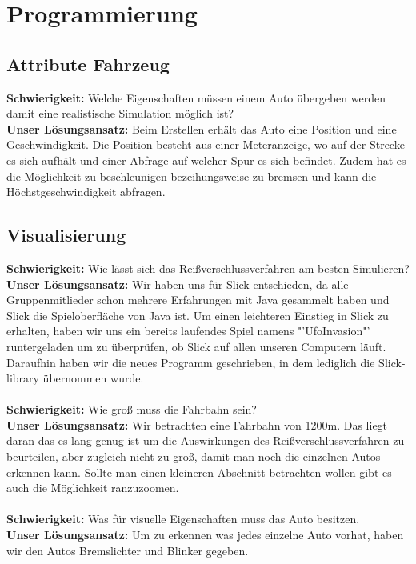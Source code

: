 \chapter{Programmierung}
\section{Attribute Fahrzeug}
\textbf{Schwierigkeit:} Welche Eigenschaften müssen einem Auto übergeben werden damit eine realistische Simulation möglich ist?\\
\textbf{Unser Lösungsansatz:} Beim Erstellen erhält das Auto eine Position und eine Geschwindigkeit. Die Position besteht aus einer Meteranzeige, wo auf der Strecke es sich aufhält und einer Abfrage auf welcher Spur es sich befindet. Zudem hat es die Möglichkeit zu beschleunigen bezeihungsweise zu bremsen und kann die Höchstgeschwindigkeit abfragen. \\
\section{Visualisierung}
\textbf{Schwierigkeit:} Wie lässt sich das Reißverschlussverfahren am besten Simulieren?\\
\textbf{Unser Lösungsansatz:} Wir haben uns für Slick entschieden, da alle Gruppenmitlieder schon mehrere Erfahrungen mit Java gesammelt haben und Slick die Spieloberfläche von Java ist. Um einen leichteren Einstieg in Slick zu erhalten, haben wir uns ein bereits laufendes Spiel namens "'UfoInvasion"' runtergeladen um zu überprüfen, ob Slick auf allen unseren Computern läuft. Daraufhin haben wir die neues Programm geschrieben, in dem lediglich die Slick-library übernommen wurde. \\\\
\textbf{Schwierigkeit:} Wie groß muss die Fahrbahn sein?\\
\textbf{Unser Lösungsansatz:} Wir betrachten eine Fahrbahn von 1200m. Das liegt daran das es lang genug ist um die Auswirkungen des Reißverschlussverfahren zu beurteilen, aber zugleich nicht zu groß, damit man noch die einzelnen Autos erkennen kann. Sollte man einen kleineren Abschnitt betrachten wollen gibt es auch die Möglichkeit ranzuzoomen.\\\\
\textbf{Schwierigkeit:} Was für visuelle Eigenschaften muss das Auto besitzen.\\
\textbf{Unser Lösungsansatz:} Um zu erkennen was jedes einzelne Auto vorhat, haben wir den Autos Bremslichter und Blinker gegeben.
